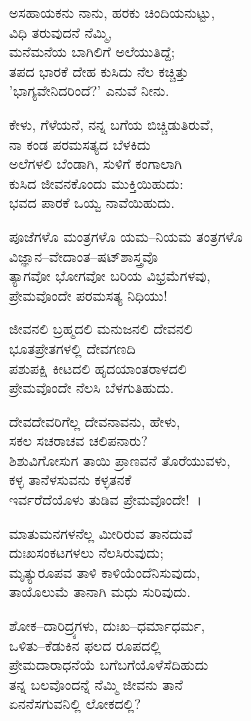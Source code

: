\begin{myquote}
ಅಸಹಾಯಕನು ನಾನು, ಹರಕು ಚಿಂದಿಯನುಟ್ಟು,\\ವಿಧಿ ತರುವುದನೆ ನೆಮ್ಮಿ,\\ಮನೆಮನೆಯ ಬಾಗಿಲಿಗೆ ಅಲೆಯುತಿದ್ದೆ;\\ತಪದ ಭಾರಕೆ ದೇಹ ಕುಸಿದು ನೆಲ ಕಚ್ಚಿತ್ತು\\'ಭಾಗ್ಯವೇನಿದರಿಂದೆ?' ಎನುವೆ ನೀನು.
\end{myquote}

\begin{myquote}
ಕೇಳು, ಗೆಳೆಯನೆ, ನನ್ನ ಬಗೆಯ ಬಿಚ್ಚಿಡುತಿರುವೆ,\\ನಾ ಕಂಡ ಪರಮಸತ್ಯದ ಬೆಳಕಿದು\\ಅಲೆಗಳಲಿ ಬೆಂಡಾಗಿ, ಸುಳಿಗೆ ಕಂಗಾಲಾಗಿ\\ಕುಸಿದ ಜೀವನಕೊಂದು ಮುಕ್ತಿಯಿಹುದು:\\ಭವದ ಪಾರಕೆ ಒಯ್ವ ನಾವೆಯಿಹುದು.
\end{myquote}

\begin{myquote}
ಪೂಜೆಗಳೊ ಮಂತ್ರಗಳೊ ಯಮ–ನಿಯಮ ತಂತ್ರಗಳೊ\\ವಿಜ್ಞಾನ–ವೇದಾಂತ–ಷಟ್‌ಶಾಸ್ತ್ರವೊ\\ತ್ಯಾಗವೋ ಭೋಗವೋ ಬರಿಯ ವಿಭ್ರಮೆಗಳವು,\\ಪ್ರೇಮವೊಂದೇ ಪರಮಸತ್ಯ ನಿಧಿಯು!
\end{myquote}

\begin{myquote}
ಜೀವನಲಿ ಬ್ರಹ್ಮದಲಿ ಮನುಜನಲಿ ದೇವನಲಿ\\ಭೂತಪ್ರೇತಗಳಲ್ಲಿ ದೇವಗಣದಿ\\ಪಶುಪಕ್ಷಿ ಕೀಟದಲಿ ಹೃದಯಾಂತರಾಳದಲಿ\\
 ಪ್ರೇಮವೊಂದೇ ನೆಲಸಿ ಬೆಳಗುತಿಹುದು.
\end{myquote}

\begin{myquote}
ದೇವದೇವರಿಗೆಲ್ಲ ದೇವನಾವನು, ಹೇಳು,\\ಸಕಲ ಸಚರಾಚವ ಚಲಿಪನಾರು?\\ಶಿಶುವಿಗೋಸುಗ ತಾಯಿ ಪ್ರಾಣವನೆ ತೊರೆಯುವಳು,\\ಕಳ್ಳ ತಾನೆಳಸುವನು ಕಳ್ಳತನಕೆ\\ಇರ್ವರೆದೆಯೊಳು ತುಡಿವ ಪ್ರೇಮವೊಂದೇ!~।
\end{myquote}

\begin{myquote}
ಮಾತುಮನಗಳನೆಲ್ಲ ಮೀರಿರುವ ತಾನದುವೆ\\ದುಃಖಸಂಕಟಗಳಲು ನೆಲಸಿರುವುದು;\\ಮೃತ್ಯುರೂಪವ ತಾಳಿ ಕಾಳಿಯೆಂದೆನಿಸುವುದು,\\ತಾಯೊಲುಮೆ ತಾನಾಗಿ ಮಧು ಸುರಿವುದು.
\end{myquote}

\begin{myquote}
ಶೋಕ–ದಾರಿದ್ರ್ಯಗಳು, ದುಃಖ–ಧರ್ಮಾಧರ್ಮ,\\ಒಳಿತು–ಕೆಡುಕಿನ ಫಲದ ರೂಪದಲ್ಲಿ\\ಪ್ರೇಮದಾರಾಧನೆಯೆ ಬಗೆಬಗೆಯೊಳೆಸೆದಿಹುದು\\ತನ್ನ ಬಲವೊಂದನ್ನೆ ನೆಮ್ಮಿ ಜೀವನು ತಾನೆ\\ಏನನೆಸಗುವನಿಲ್ಲಿ ಲೋಕದಲ್ಲಿ?
\end{myquote}

